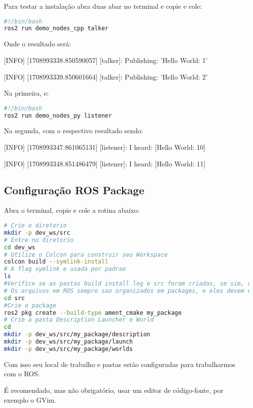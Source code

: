 Para testar a instalação abra duas abar no terminal e copie e cole:

\begin{lstlisting}[language=bash,caption={bash version}]
#!/bin/bash
ros2 run demo_nodes_cpp talker
\end{lstlisting}

Onde o resultado será:

[INFO] [1708993338.850590057] [talker]: Publishing: 'Hello World: 1'

[INFO] [1708993339.850601664] [talker]: Publishing: 'Hello World: 2'

Na primeira, e:

\begin{lstlisting}[language=bash,caption={bash version}]
#!/bin/bash
ros2 run demo_nodes_py listener
\end{lstlisting}

Na segunda, com o respectivo resultado sendo:

[INFO] [1708993347.861065131] [listener]: I heard: [Hello World: 10]

[INFO] [1708993348.851486479] [listener]: I heard: [Hello World: 11]

\subsection{Configuração ROS Package}

Abra o terminal, copie e cole a rotina abaixo:

\begin{lstlisting}[language=bash,caption={bash version}]
# Crie o diretorio
mkdir -p dev_ws/src
# Entre no diretorio
cd dev_ws
# Utilize o Colcon para construir seu Workspace
colcon build --symlink-install
# A flag symlink e usada por padrao
ls
#Verifice se as pastas build install log e src foram criadas, se sim, voce tem agora um workspace vazio.
# Os arquivos em ROS sempre sao organizados em packages, e eles devem estar no diretorio src
cd src
#Crie o package
ros2 pkg create --build-type ament_cmake my_package
# Crie a pasta Description Launcher e World
cd
mkdir -p dev_ws/src/my_package/description
mkdir -p dev_ws/src/my_package/launch
mkdir -p dev_ws/src/my_package/worlds
\end{lstlisting}

Com isso seu local de trabalho e pastas estão configuradas para trabalharmos com o ROS.

É recomendado, mas não obrigatório, usar um editor de código-fonte, por exemplo o GVim.

